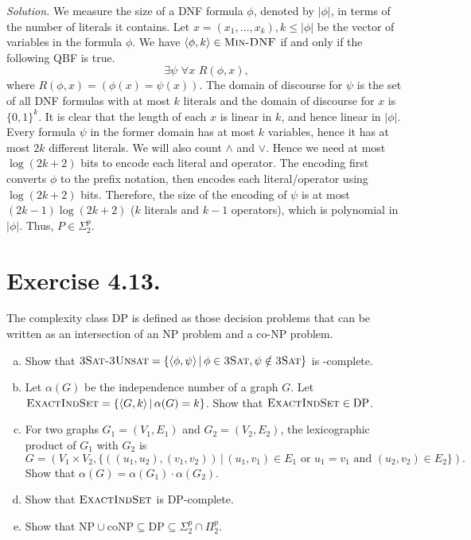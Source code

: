 \textit{Solution.} We measure the size of a DNF formula $\phi$, denoted by $|\phi|$, in terms of the number of literals it contains. Let $x=(x_1,\ldots,x_k), k\le |\phi|$  be the vector of variables in the formula $\phi$. We have $\langle \phi, k\rangle\in \textsc{Min-DNF}$ if and only if the following QBF is true.
$$\exists \psi  \,\,\forall x\,\, R(\phi,x),$$
where $R(\phi,x) = (\phi(x) = \psi(x))$. The domain of discourse for $\psi$ is the set of all DNF formulas with at most $k$ literals and the domain of discourse for $x$ is $\{0,1\}^k$. It is clear that the length of each $x$ is linear in $k$, and hence linear in $|\phi|$. Every formula $\psi$ in the former domain has at most $k$ variables, hence it has at most $2k$ different literals. We will also count $\wedge$ and $\vee$. Hence we need at most $\log(2k+2)$ bits to encode each literal and operator. The encoding first converts $\phi$ to the prefix notation, then encodes each literal/operator using $\log(2k+2)$ bits. Therefore, the size of the encoding of $\psi$ is at most $(2k-1)\log(2k+2)$ ($k$ literals and $k-1$ operators), which is polynomial in $|\phi|$. Thus, $P\in \Sigma_2^p$.

\section{Exercise 4.13.} The complexity class DP is defined as those decision problems that can be written as an intersection of an NP problem and a co-NP problem.

\begin{enumerate}[(a)]
  \item Show that $\textsc{3Sat-3Unsat} = \{\langle \phi,\psi\rangle \,|\, \phi\in\textsc{3Sat}, \psi\notin\textsc{3Sat}\}$ is -complete.
  \item Let $\alpha(G)$ be the independence number of a graph $G$. Let $\textsc{ExactIndSet} = \{\langle G,k\rangle \,|\, \alpha(G) = k\}$. Show that $\textsc{ExactIndSet}\in \text{DP}$.
  \item For two graphs $G_1=(V_1,E_1)$ and $G_2=(V_2,E_2)$, the lexicographic product of $G_1$ with $G_2$ is
        $$G = (V_1\times V_2, \{((u_1,u_2),(v_1,v_2)) \,|\, (u_1,v_1)\in E_1 \text{ or } u_1 = v_1 \text{ and } (u_2,v_2)\in E_2\}).$$
        Show that $\alpha(G)=\alpha(G_1)\cdot\alpha(G_2)$.
  \item Show that $\textsc{ExactIndSet}$ is DP-complete.
  \item Show that $\text{NP}\cup\text{coNP}\subseteq \text{DP}\subseteq \Sigma_2^p\cap \Pi_2^p$.
\end{enumerate}

